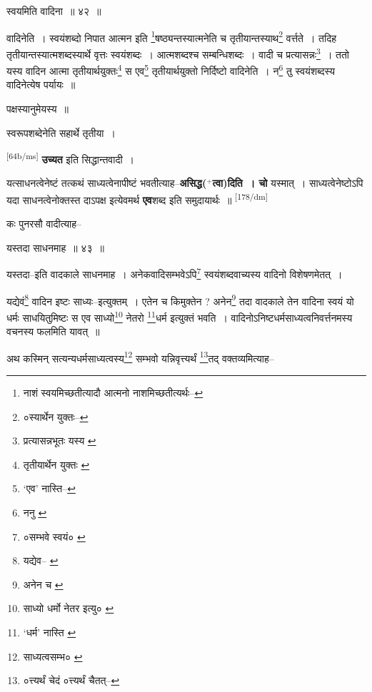 \documentclass[article,12pt,a4paper]{memoir}
\newcommand{\add}[1]{($^{+}$#1)}
\begin{document}
	  \pstart स्वयमिति वादिना ॥ ४२ ॥
	\pend
       

	  \pstart वादिनेति । स्वयंशब्दो निपात आत्मन इति \footnote{नाशं स्वयमिच्छतीत्यादौ आत्मनो नाशमिच्छतीत्यर्थः--\cite{dp-msD-n}}षष्ठ्यन्तस्यात्मनेति च तृतीयान्तस्याथ\footnote{०स्यार्थेन युक्तः--\cite{dp-msB}} वर्त्तते । तदिह तृतीयान्तस्यात्मशब्दस्यार्थे वृत्तः स्वयंशब्दः । आत्मशब्दश्च सम्बन्धिशब्दः । वादी च प्रत्यासन्नः\footnote{प्रत्यासन्नभूतः यस्य \cite{dp-msA} \cite{dp-msB} \cite{dp-edP} \cite{dp-edH}} । ततो यस्य वादिन आत्मा तृतीयार्थयुक्तः\footnote{तृतीयार्थेन युक्तः \cite{dp-msC} \cite{dp-msD}} स एव\footnote{‘एव’ नास्ति--\cite{dp-msB}} तृतीयार्थयुक्तो निर्दिष्टो वादिनेति । न\footnote{ननु \cite{dp-msA} \cite{dp-msB} \cite{dp-edP} \cite{dp-edH}} तु स्वयंशब्दस्य वादिनेत्येष पर्यायः ॥
	\pend
      

	  \pstart पक्षस्यानुमेयस्य ॥
	\pend
      

	  \pstart स्वरूपशब्देनेति सहार्थे तृतीया ।
	\pend
      

	  \pstart \leavevmode\textsuperscript{\rmlatinfont\tiny [64b/ms]} \textbf{उच्यत} इति सिद्धान्तवादी ।
	\pend
      

	  \pstart यत्साधनत्वेनेष्टं तत्कथं साध्यत्वेनापीष्टं भवतीत्याह--\textbf{असिद्ध\add{त्वा}दिति । चो} यस्मात् । साध्यत्वेनेष्टोऽपि यदा साधनत्वेनोक्तस्त दाऽपक्ष इत्येवमर्थ \textbf{एव}शब्द इति समुदायार्थः ॥
	\pend
      \leavevmode\textsuperscript{\rmlatinfont\tiny [178/dm]}

	  \pstart कः पुनरसौ वादीत्याह--
	\pend
       

	  \pstart यस्तदा साधनमाह ॥ ४३ ॥
	\pend
       

	  \pstart यस्तदा--इति वादकाले साधनमाह । अनेकवादिसम्भवेऽपि\footnote{०सम्भवे स्वयं० \cite{dp-msB} \cite{dp-msC} \cite{dp-msD}} स्वयंशब्दवाच्यस्य वादिनो विशेषणमेतत् ।
	\pend
       

	  \pstart यद्येवं\footnote{यद्येव--\cite{dp-msA} \cite{dp-msB} \cite{dp-edP} \cite{dp-edH}} वादिन इष्टः साध्यः--इत्युक्तम् । एतेन च किमुक्तेन ? अनेन\footnote{अनेन च \cite{dp-msC}} तदा वादकाले तेन वादिना स्वयं यो धर्मः साधयितुमिष्टः स एव साध्यो\footnote{साध्यो धर्मो नेतर इत्यु० \cite{dp-msC}} नेतरो \footnote{‘धर्म’ नास्ति \cite{dp-msB}}धर्म इत्युक्तं भवति । वादिनोऽनिष्टधर्मसाध्यत्वनिवर्त्तनमस्य वचनस्य फलमिति यावत् ॥
	\pend
       

	  \pstart अथ कस्मिन् सत्यन्यधर्मसाध्यत्वस्य\footnote{साध्यत्वसम्भ० \cite{dp-msA} \cite{dp-msC} \cite{dp-edP} \cite{dp-edH} \cite{dp-edE}} सम्भवो यन्निवृत्त्यर्थं \footnote{०त्त्यर्थं चेदं \cite{dp-msA} \cite{dp-msD} \cite{dp-edP} \cite{dp-edH} \cite{dp-edE} \cite{dp-edN} ०त्त्यर्थं चैतत्--\cite{dp-msB}}तद् वक्तव्यमित्याह--
	\pend
       
\end{document}
